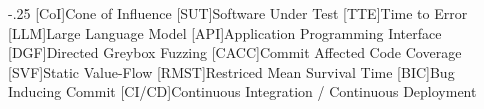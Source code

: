 \documentclass[headsepline,footsepline,footinclude=false,oneside,fontsize=11pt,paper=a4,listof=totoc,bibliography=totoc]{scrbook} %
\begin{document}


\frontmatter{}





\tableofcontents{}

\mainmatter{}








\appendix



\begin{acronym}
	\itemsep-.25\baselineskip
	[CoI]{Cone of Influence}
	[SUT]{Software Under Test}
    [TTE]{Time to Error}
    [LLM]{Large Language Model}
    [API]{Application Programming Interface}
    [DGF]{Directed Greybox Fuzzing}
    [CACC]{Commit Affected Code Coverage}
    [SVF]{Static Value-Flow}
    [RMST]{Restriced Mean Survival Time}
    [BIC]{Bug Inducing Commit}
    [CI/CD]{Continuous Integration / Continuous Deployment}
\end{acronym}

\listoffigures{}
\listoftables{}
\printbibliography{}
\end{document}
